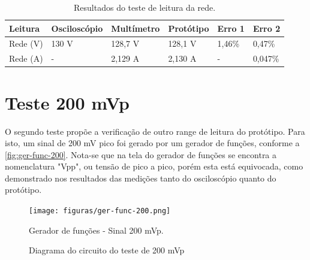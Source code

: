 \begin{table}[!ht]
    \centering
    \caption{Resultados do teste de leitura da rede.}
    \label{tab:resultados-01}
    \begin{tabular}{ l l l l l l }
        \hline
        \textbf{Leitura} & \textbf{Osciloscópio} & \textbf{Multímetro} & \textbf{Protótipo}  & \textbf{Erro 1}  & \textbf{Erro 2}  \\ \hline
        Rede (V)         & 130 V                 & 128,7 V             & 128,1 V             & 1,46\%           & 0,47\%           \\ 
        Rede (A)         & -                     & 2,129 A             & 2,130 A             & -                & 0,047\%          \\ \hline
    \end{tabular}
    \fonte{}
\end{table}



\section{Teste 200 mVp}\label{teste-200mv}

O segundo teste propõe a verificação de outro range de leitura do protótipo. Para isto, um sinal de 200 mV pico foi gerado por um gerador de funções, conforme a \autoref{fig:ger-func-200}. Nota-se que na tela do gerador de funções se encontra a nomenclatura "Vpp", ou tensão de pico a pico, porém esta está equivocada, como demonstrado nos resultados das medições tanto do osciloscópio quanto do protótipo.

\begin{figure}[htb!]
    \caption{Gerador de funções - Sinal 200 mVp.}
    \label{fig:ger-func-200}
    \texttt{[image: figuras/ger-func-200.png]}
    \fonte{}
\end{figure}

\begin{figure}[htb!]
    \caption{Diagrama do circuito do teste de 200 mVp}
    \label{fig:circ-200}
    \fonte{}
\end{figure}

